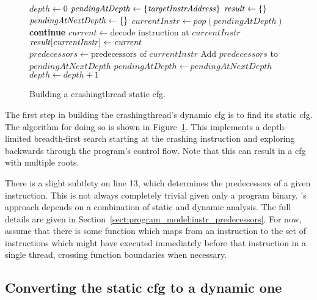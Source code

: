 \begin{figure}
\begin{algorithmic}[1]
\State $\mathit{depth} \gets 0$
\State $\mathit{pendingAtDepth} \gets \{\mathit{targetInstrAddress}\}$
\State $\mathit{result} \gets \{\}$
  \State $\mathit{pendingAtNextDepth} \gets \{\}$
    \State $\mathit{currentInstr} \gets \mathit{pop}(\mathit{pendingAtDepth})$
      \State \textbf{continue}
    \EndIf
    \State $\mathit{current} \gets \text{decode instruction at } \mathit{currentInstr}$
    \State $\mathit{result}[\mathit{currentInstr}] \gets \mathit{current}$
    \State $\mathit{predecessors} \gets \text{predecessors of } \mathit{currentInstr}$
    \State Add $\mathit{predecessors}$ to $\mathit{pendingAtNextDepth}$
  \EndWhile
  \State $\mathit{pendingAtDepth} \gets \mathit{pendingAtNextDepth}$
  \State $\mathit{depth} \gets \mathit{depth} + 1$
\EndWhile
\end{algorithmic}
\caption{Building a \gls{crashingthread} static \gls{cfg}.}
\label{fig:derive:static_read_cfg_single_function}
\end{figure}

The first step in building the \gls{crashingthread}'s dynamic
\gls{cfg} is to find its static \gls{cfg}.  The algorithm for doing so
is shown in Figure~\ref{fig:derive:static_read_cfg_single_function}.
This implements a depth-limited breadth-first search starting at the
crashing instruction and exploring backwards through the program's
control flow.  Note that this can result in a \gls{cfg} with multiple
roots.

There is a slight subtlety on line 13, which determines the
predecessors of a given instruction.  This is not always completely
trivial given only a program binary.  {\Technique}'s approach depends
on a combination of static and dynamic analysis.  The full details are
given in Section~\ref{sect:program_model:instr_predecessors}.  For
now, assume that there is some function which maps from an instruction
to the set of instructions which might have executed immediately
before that instruction in a single thread, crossing function
boundaries when necessary.

\subsection[Converting the static \glsentrytext{cfg} to a dynamic one]{Converting the static \gls{cfg} to a dynamic one}
\label{sect:derive:handling_loops}

